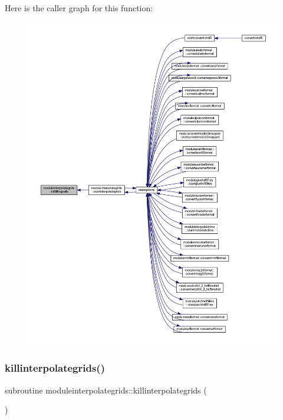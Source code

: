 Here is the caller graph for this function\+:\nopagebreak
\begin{figure}[H]
\begin{center}
\leavevmode
\includegraphics[width=350pt]{namespacemoduleinterpolategrids_ab2c9728a897c55e3db86eb34edf09800_icgraph}
\end{center}
\end{figure}
\mbox{\label{namespacemoduleinterpolategrids_a99be0febe139538023f622ad08cd5770}} 
\subsubsection{\texorpdfstring{killinterpolategrids()}{killinterpolategrids()}}
{\footnotesize\ttfamily subroutine moduleinterpolategrids\+::killinterpolategrids (\begin{DoxyParamCaption}{ }\end{DoxyParamCaption})\hspace{0.3cm}{\ttfamily [private]}}

